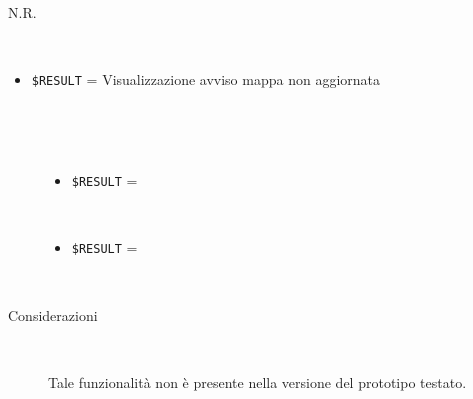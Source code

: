 \documentclass[../../SperimentazioniPratiche.tex]{subfiles}
\begin{document}
	
	\newpage	
			\paragraph*{}	
			\label{Prova6A.1}
			\begin{tcolorbox}[fonttitle=\bfseries, 
								adjusted title={\Large Prova 6A.1}, 
								breakable, 
								sharp corners=south,
								colback=white, 
								colframe=white!60!black]
								
				\begin{description}[leftmargin=0.7cm,labelwidth=!]
				
					\item[Input] \ \par 
        				N.R.
        			\tcbline 
        				
        			\item[Output atteso] \ \par
        				\begin{itemize}
        					\item \verb|$RESULT| = Visualizzazione avviso mappa non aggiornata
        				\end{itemize}

					\tcbline        				
        				
        			\item[Output riscontrato] \ \par
        				\begin{description}
        				
        					\item[\dispositivoA] \ \par
        					\begin{itemize}
        						\item \verb|$RESULT| = \ns
        					\end{itemize}      					
        					
        					\item[\dispositivoB] \ \par
        					\begin{itemize}
        						\item \verb|$RESULT| = \ns
        					\end{itemize}
        					
        				\end{description}
        				
        			\tcbline
        			
        			\item[Analisi risultati] \ \par
        				\begin{description}
        					\item[Considerazioni] \ \par
        						Tale funzionalità non è presente nella versione del prototipo testato.
        					

\end{description}
\end{description}
\end{tcolorbox}
\end{document}

